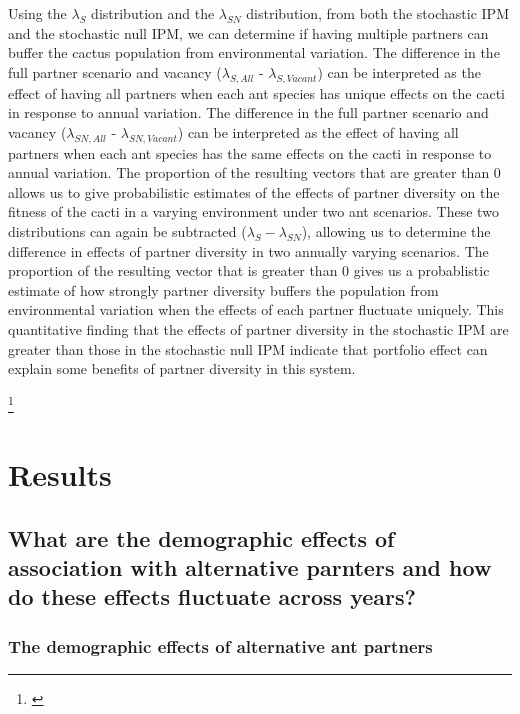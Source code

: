 \documentclass[11pt]{article}
\newcommand{\ali}[2]{{\color{blue}{#1}}\footnote{\textit{\color{blue}{#2}}}}
\begin{document}
Using the $\lambda_S$ distribution and the $\lambda_{SN}$ distribution, from both the stochastic IPM and the stochastic null IPM, we can determine if having multiple partners can buffer the cactus population from environmental variation.
The difference in the full partner scenario and vacancy ($\lambda_{S,All}$ - $\lambda_{S,Vacant}$) can be interpreted as the effect of having all partners when each ant species has unique effects on the cacti in response to annual variation.
The difference in the full partner scenario and vacancy ($\lambda_{SN,All}$ - $\lambda_{SN,Vacant}$) can be interpreted as the effect of having all partners when each ant species has the same effects on the cacti in response to annual variation.
The proportion of the resulting vectors that are greater than 0 allows us to give  probabilistic estimates of the effects of partner diversity on the fitness of the cacti in a varying environment under two ant scenarios.
These two distributions can again be subtracted ($\lambda_{S} - \lambda_{SN}$), allowing us to determine the difference in effects of partner diversity in two annually varying scenarios.
The proportion of the resulting vector that is greater than 0 gives us a probablistic estimate of how strongly partner diversity buffers the population from environmental variation when the effects of each partner fluctuate uniquely.
This quantitative finding that the effects of partner diversity in the stochastic IPM are greater than those in the stochastic null IPM indicate that portfolio effect can explain some benefits of partner diversity in this system.

\ali{}{I focused on several things throughout this rewrite of the methods: I tried to go straight into talking about the stochastic IPM, I focused on explaining rationale for specific numbers better, I tried to update notation to be clearer, and I tried to explain more clearly... not sure if I've accomplished these, let me know}

  
\section*{Results}
\subsection*{What are the demographic effects of association with alternative parnters and how do these effects fluctuate across years?}
\subsubsection*{The demographic effects of alternative ant partners}
\end{document}
